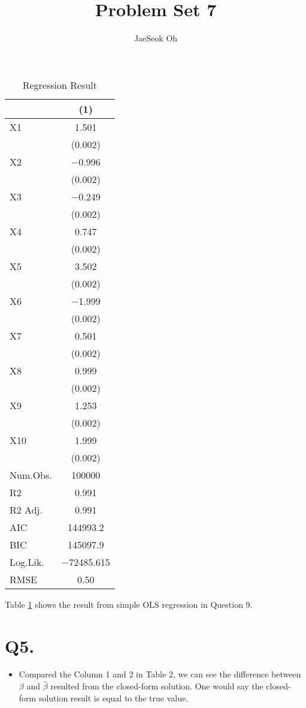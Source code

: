 \documentclass{article}
\title{Problem Set 7}
\author{JaeSeok Oh}
\begin{document}
	\maketitle
	
\begin{table}[h]
	\centering\caption{Regression Result}\centering
	\begin{tabular}[t]{lc}\toprule  & (1)\\\midrule
		X1 & \num{1.501}\\ & \vphantom{9} (\num{0.002})\\X2 & \num{-0.996}\\ & \vphantom{8} (\num{0.002})\\X3 & \num{-0.249}\\ & \vphantom{7} (\num{0.002})\\X4 & \num{0.747}\\ & \vphantom{6} (\num{0.002})\\X5 & \num{3.502}\\ & \vphantom{5} (\num{0.002})\\X6 & \num{-1.999}\\ & \vphantom{4} (\num{0.002})\\X7 & \num{0.501}\\ & \vphantom{3} (\num{0.002})\\X8 & \num{0.999}\\ & \vphantom{2} (\num{0.002})\\X9 & \num{1.253}\\ & \vphantom{1} (\num{0.002})\\X10 & \num{1.999}\\ & (\num{0.002})\\\midrule
		Num.Obs. & \num{100000}\\R2 & \num{0.991}\\R2 Adj. & \num{0.991}\\AIC & \num{144993.2}\\BIC & \num{145097.9}\\Log.Lik. & \num{-72485.615}\\RMSE & \num{0.50}\\\bottomrule
	\end{tabular}
	\label{t1:table1}
\end{table}

Table \ref{t1:table1} shows the result from simple OLS regression in Question 9.

\section*{Q5.}
\begin{itemize}
	\item Compared the Column 1 and 2 in Table 2, we can see the difference between $\beta $ and $ \widehat{\beta} $ resulted from the closed-form solution. One would say the closed-form solution result is equal to the true value.
\end{itemize}
\end{document}
